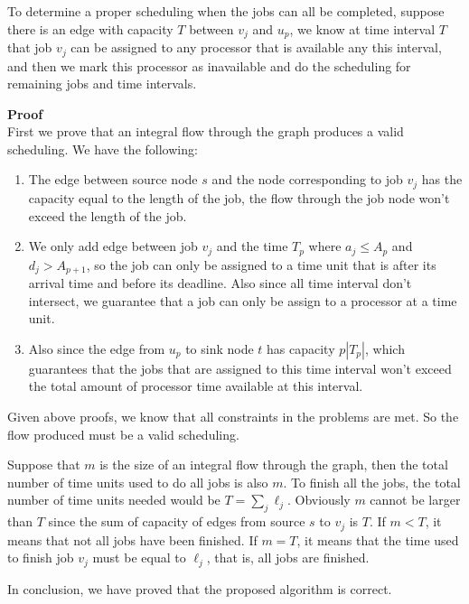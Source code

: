 \documentclass{article}
\newcommand{\Proof}{\vspace{0.3cm} \noindent\textbf{Proof} \\}
\begin{document}
To determine a proper scheduling when the
jobs can all be completed, suppose there is an edge with capacity $T$ between $v_j$ and $u_p$, 
we know at time interval $T$ that job $v_j$ can be assigned to any processor that is available
any this interval, and then we mark this processor as inavailable and do the scheduling for
remaining jobs and time intervals.    

\Proof
First we prove that an integral flow through the graph produces a valid scheduling. We have the
following:
\begin{enumerate}
  \item The edge between source node $s$ and the node corresponding to job $v_j$ has the capacity equal
    to the length of the job, the flow through the job node won't exceed the length of the job. 
  \item We only add edge between job $v_j$ and the time $T_p$ where $a_j \leq A_p$ and $d_j >
    A_{p+1}$, so the
    job can only be assigned to a time unit that is after its arrival time and before its deadline.
    Also since all time interval don't intersect, we guarantee that a job can only be assign to a
    processor at a time unit. 
  \item
  Also since the edge from $u_p$ to sink node $t$ has capacity $p|T_p|$, which guarantees that the
  jobs that are assigned to this time interval won't exceed the total amount of processor time
  available at this interval. 
\end{enumerate}
Given above proofs, we know that all constraints in the problems are met. So the flow produced
must be a valid scheduling.  

Suppose that $m$ is the size of an integral flow through the graph, then the total number of time
units used to do all jobs is also $m$. To finish all the jobs, the total number of time units needed
would be $T = \sum_{j}\ell_j$. Obviously $m$ cannot be larger than $T$ since the sum of capacity
of edges from source $s$ to $v_j$ is $T$. If $m < T$, it means that not all jobs have been finished.       
If $m = T$, it means that the time used to finish job $v_j$ must be equal to $\ell_j$, that is, all
jobs are finished.

In conclusion, we have proved that the proposed algorithm is correct.
\end{document}
